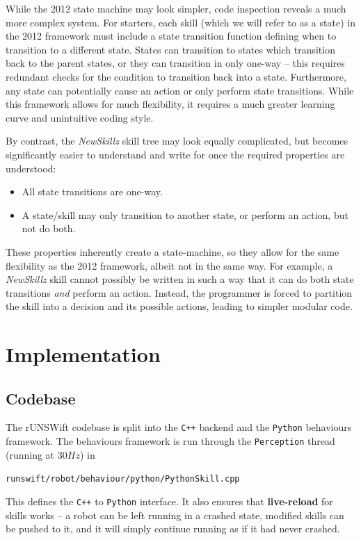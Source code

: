 While the 2012 state machine may look simpler, code inspection reveals a much more complex system. For starters, each skill (which we will refer to as a state) in the 2012 framework must include a state transition function defining when to transition to a different state. States can transition to states which transition back to the parent states, or they can transition in only one-way -- this requires redundant checks for the condition to transition back into a state. Furthermore, any state can potentially cause an action or only perform state transitions. While this framework allows for much flexibility, it requires a much greater learning curve and unintuitive coding style.

By contrast, the \textit{NewSkillz} skill tree may look equally complicated, but becomes significantly easier to understand and write for once the required properties are understood:

\begin{itemize}
\item All state transitions are one-way.
\item A state/skill may only transition to another state, or perform an action, but not do both.
\end{itemize}

These properties inherently create a state-machine, so they allow for the same flexibility as the 2012 framework, albeit not in the same way. For example, a \textit{NewSkillz} skill cannot possibly be written in such a way that it can do both state transitions \textit{and} perform an action. Instead, the programmer is forced to partition the skill into a decision and its possible actions, leading to simpler modular code.

\section{Implementation}

\subsection{Codebase}

The rUNSWift codebase is split into the \verb!C++! backend and the \verb!Python! behaviours framework. The behaviours framework is run through the \texttt{Perception} thread (running at $30Hz$) in 

\texttt{runswift/robot/behaviour/python/PythonSkill.cpp}

This defines the \verb!C++! to \verb!Python! interface. It also ensures that \textbf{live-reload} for skills works -- a robot can be left running in a crashed state, modified skills can be pushed to it, and it will simply continue running as if it had never crashed.

